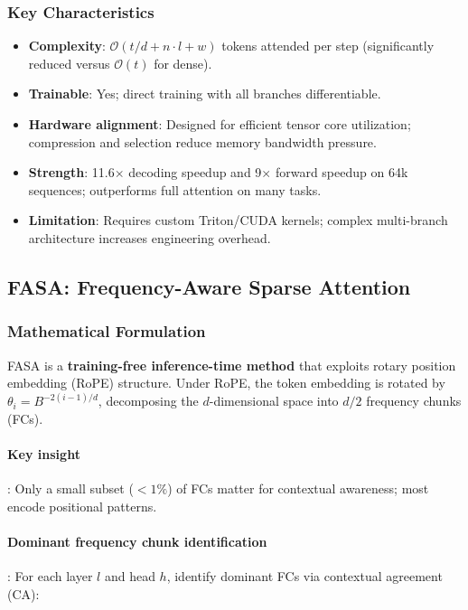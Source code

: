 \documentclass[11pt,a4paper]{article}
\begin{document}
\subsubsection{Key Characteristics}

\begin{itemize}[leftmargin=*]
    \item \textbf{Complexity}: $\mathcal{O}(t/d + n \cdot l + w)$ tokens attended per step (significantly reduced versus $\mathcal{O}(t)$ for dense).
    \item \textbf{Trainable}: Yes; direct training with all branches differentiable.
    \item \textbf{Hardware alignment}: Designed for efficient tensor core utilization; compression and selection reduce memory bandwidth pressure.
    \item \textbf{Strength}: 11.6$\times$ decoding speedup and 9$\times$ forward speedup on 64k sequences; outperforms full attention on many tasks.
    \item \textbf{Limitation}: Requires custom Triton/CUDA kernels; complex multi-branch architecture increases engineering overhead.
\end{itemize}

\subsection{FASA: Frequency-Aware Sparse Attention}

\subsubsection{Mathematical Formulation}

FASA \citep{wang_fasa_2026} is a \textbf{training-free inference-time method} that exploits rotary position embedding (RoPE) structure. Under RoPE, the token embedding is rotated by $\theta_i = B^{-2(i-1)/d}$, decomposing the $d$-dimensional space into $d/2$ frequency chunks (FCs).

\paragraph{Key insight}: Only a small subset ($ < 1\%$) of FCs matter for contextual awareness; most encode positional patterns.

\paragraph{Dominant frequency chunk identification}: For each layer $l$ and head $h$, identify dominant FCs via contextual agreement (CA):
\end{document}
